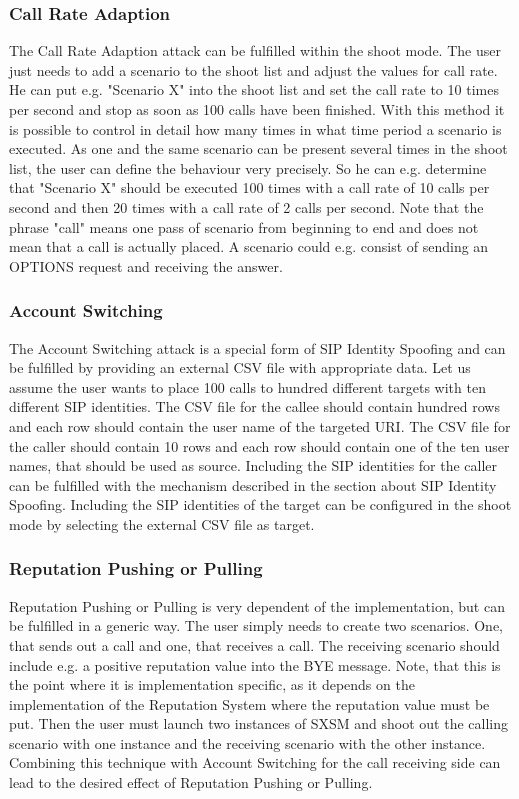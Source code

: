 \documentclass[final
	]{issa}
\begin{document}
\subsubsection{Call Rate Adaption}
The Call Rate Adaption attack can be fulfilled within the shoot mode. The user just needs to add a scenario to the shoot list and adjust the values for call rate. He can put e.g. "Scenario X" into the shoot list and set the call rate to 10 times per second and stop as soon as 100 calls have been finished. With this method it is possible to control in detail how many times in what time period a scenario is executed. As one and the same scenario can be present several times in the shoot list, the user can define the behaviour very precisely. So he can e.g. determine that "Scenario X" should be executed 100 times with a call rate of 10 calls per second and then 20 times with a call rate of 2 calls per second. Note that the phrase "call" means one pass of scenario from beginning to end and does not mean that a call is actually placed. A scenario could e.g. consist of sending an OPTIONS request and receiving the answer.
\subsubsection{Account Switching}
The Account Switching attack is a special form of SIP Identity Spoofing and can be fulfilled by providing an external CSV file with appropriate data. Let us assume the user wants to place 100 calls to hundred different targets with ten different SIP identities. The CSV file for the callee should contain hundred rows and each row should contain the user name of the targeted URI. The CSV file for the caller should contain 10 rows and each row should contain one of the ten user names, that should be used as source. Including the SIP identities for the caller can be fulfilled with the mechanism described in the section about SIP Identity Spoofing. Including the SIP identities of the target can be configured in the shoot mode by selecting the external CSV file as target.
\subsubsection{Reputation Pushing or Pulling}
Reputation Pushing or Pulling is very dependent of the implementation, but can be fulfilled in a generic way. The user simply needs to create two scenarios. One, that sends out a call and one, that receives a call. The receiving scenario should include e.g. a positive reputation value into the BYE message. Note, that this is the point where it is implementation specific, as it depends on the implementation of the Reputation System where the reputation value must be put. Then the user must launch two instances of SXSM and shoot out the calling scenario with one instance and the receiving scenario with the other instance. Combining this technique with Account Switching for the call receiving side can lead to the desired effect of Reputation Pushing or Pulling.
\end{document}
